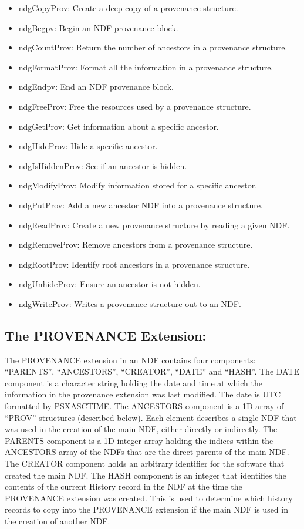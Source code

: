 \documentclass[twoside,11pt]{article}
\renewcommand{\_}{\texttt{\symbol{95}}}
\begin{document}
\begin{itemize}
   \item  ndgCopyProv: Create a deep copy of a provenance structure.
   \item  ndgBegpv: Begin an NDF provenance block.
   \item  ndgCountProv: Return the number of ancestors in a provenance structure.
   \item  ndgFormatProv: Format all the information in a provenance structure.
   \item  ndgEndpv: End an NDF provenance block.
   \item  ndgFreeProv: Free the resources used by a provenance structure.
   \item  ndgGetProv: Get information about a specific ancestor.
   \item  ndgHideProv: Hide a specific ancestor.
   \item  ndgIsHiddenProv: See if an ancestor is hidden.
   \item  ndgModifyProv: Modify information stored for a specific ancestor.
   \item  ndgPutProv: Add a new ancestor NDF into a provenance structure.
   \item  ndgReadProv: Create a new provenance structure by reading a given NDF.
   \item  ndgRemoveProv: Remove ancestors from a provenance structure.
   \item  ndgRootProv: Identify root ancestors in a provenance structure.
   \item  ndgUnhideProv: Ensure an ancestor is not hidden.
   \item  ndgWriteProv: Writes a provenance structure out to an NDF.
\end{itemize}

\subsection{The PROVENANCE Extension:}

The PROVENANCE extension in an NDF contains four components: ``PARENTS'',
``ANCESTORS'', ``CREATOR'', ``DATE'' and ``HASH''. The DATE component is a
character string holding the date and time at which the information in
the provenance extension was last modified. The date is UTC formatted by
PSX\_ASCTIME. The ANCESTORS component is a 1D array of ``PROV'' structures
(described below). Each element describes a single NDF that was used in
the creation of the main NDF, either directly or indirectly. The PARENTS
component is a 1D integer array holding the indices within the ANCESTORS
array of the NDFs that are the direct parents of the main NDF. The
CREATOR component holds an arbitrary identifier for the software that
created the main NDF. The HASH component is an integer that identifies
the contents of the current History record in the NDF at the time the
PROVENANCE extension was created. This is used to determine which history
records to copy into the PROVENANCE extension if the main NDF is used in
the creation of another NDF.
\end{document}
